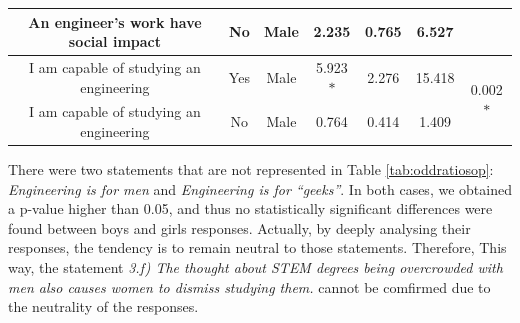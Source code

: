 \documentclass[journal,transmag]{IEEEtran}
\begin{document}
\begin{table}
\begin{center}
\begin{tabular}{|c|c|c|c|c|c|c|}
		An engineer’s work have social impact   & No     & Male   & 2.235    & 0.765      & 6.527      &                              \\ \hline
		I am capable of studying an engineering & Yes    & Male   & 5.923$*$ & 2.276      & 15.418     & \multirow{2}{*}{0.002$*$}    \\ \cline{1-6}
		I am capable of studying an engineering & No     & Male   & 0.764    & 0.414      & 1.409      &                              \\ \hline
		\end{tabular}
	\end{center}
\end{table}

There were two statements that are not represented in Table \ref{tab:oddratiosop}: \textit{Engineering is for men} and \textit{Engineering is for ``geeks''}. In both cases, we obtained a p-value higher than 0.05, and thus no statistically significant differences were found between boys and girls responses. Actually, by deeply analysing their responses, the tendency is to remain neutral to those statements. Therefore, This way, the statement \textit{3.f) The thought about STEM degrees being overcrowded with men also causes women to dismiss studying them.} cannot be comfirmed due to the neutrality of the responses.

%
\end{document}
